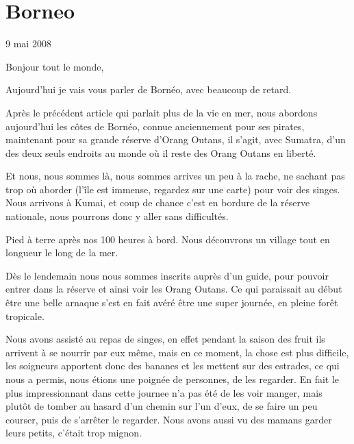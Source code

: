 \section{Borneo}

9 mai 2008

\begin{multicols}{2}

Bonjour tout le monde,

Aujourd'hui je vais vous parler de Bornéo, avec beaucoup de retard.

Après le précédent article qui parlait plus de la vie en mer, nous abordons aujourd'hui les côtes de Bornéo, connue anciennement pour ses pirates, maintenant pour sa grande réserve d'Orang Outans, il s'agit, avec Sumatra, d'un des deux seuls endroits au monde où il reste des Orang Outans en liberté.

Et nous, nous sommes là, nous sommes arrives un peu à la rache, ne sachant pas trop où aborder (l'île est immense, regardez sur une carte) pour voir des singes. Nous arrivons à Kumai, et coup de chance c'est en bordure de la réserve nationale, nous pourrons donc y aller sans difficultés.

Pied à terre après nos 100 heures à bord. Nous découvrons un village tout en longueur le long de la mer.



Dès le lendemain nous nous sommes inscrits auprès d'un guide, pour pouvoir entrer dans la réserve et ainsi voir les Orang Outans. Ce qui paraissait au début être une belle arnaque s'est en fait avéré être une super journée, en pleine forêt tropicale.


Nous avons assisté au repas de singes, en effet pendant la saison des fruit ils arrivent à se nourrir par eux même, mais en ce moment, la chose est plus difficile, les soigneurs apportent donc des bananes et les mettent sur des estrades, ce qui nous a permis, nous étions une poignée de personnes, de les regarder. En fait le plus impressionnant dans cette journee n'a pas été de les voir manger, mais plutôt de tomber au hasard d'un chemin sur l'un d'eux, de se faire un peu courser, puis de s'arrêter le regarder. Nous avons aussi vu des mamans garder leurs petits, c'était trop mignon.


\end{multicols}
